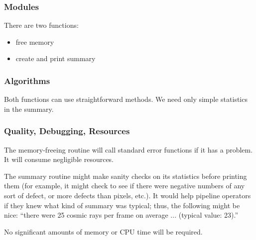 \subsubsection {Modules}

  There are two functions:

\begin{itemize}
  \item free memory
  \item create and print summary
\end{itemize}

\subsubsection {Algorithms}

  Both functions can use straightforward methods.
We need only simple statistics in the summary.

\subsubsection {Quality, Debugging, Resources}

  The memory-freeing routine will call standard error
functions if it has a problem.  It will consume negligible
resources.

  The summary routine might make sanity checks
on its statistics before printing them (for example,
it might check to see if there were negative numbers
of any sort of defect, or more defects than pixels, etc.).
It would help pipeline operators if they knew what
kind of summary was typical; thus, the following
might be nice: ``there were 25 cosmic rays per frame on
average ... (typical value: 23).''

  No significant amounts of memory or CPU time will
be required.

